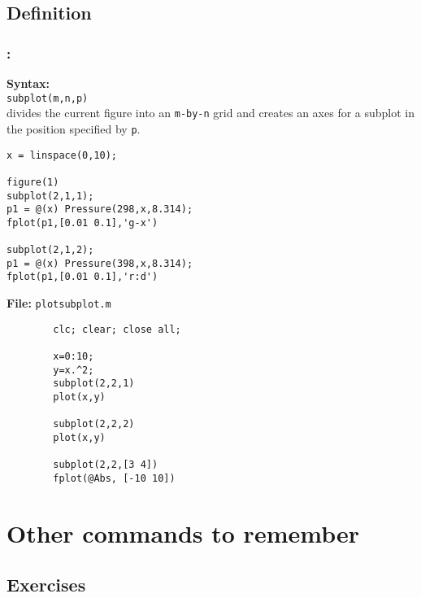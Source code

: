 \documentclass[11pt]{beamer}
\begin{document}
\subsection{Definition}
\begin{frame}[fragile]
	
	\frametitle{\secname : \subsecname}
	\vspace{-17pt}
	\begin{minipage}[t]{0.55\linewidth}
	\begin{exampleblock}{}
	\textbf{Syntax:}\\
	\verb|subplot(m,n,p)| \\
	divides the current figure into an \verb|m-by-n| grid and creates an axes for a subplot in the position specified by \verb|p|.
	\end{exampleblock}
	\vspace{-10pt}
	\begin{verbatim}
x = linspace(0,10);

figure(1)
subplot(2,1,1);
p1 = @(x) Pressure(298,x,8.314);
fplot(p1,[0.01 0.1],'g-x')
	
subplot(2,1,2);
p1 = @(x) Pressure(398,x,8.314);
fplot(p1,[0.01 0.1],'r:d')
	\end{verbatim}			
	\end{minipage}
	\hspace{7pt}
	\begin{minipage}[t]{0.41\linewidth}
	\vspace{10pt}
		\textbf{File:} \verb|plotsubplot.m|
		\begin{verbatim}
		clc; clear; close all;
		
		x=0:10;
		y=x.^2;
		subplot(2,2,1)
		plot(x,y)
		
		subplot(2,2,2)
		plot(x,y)
		
		subplot(2,2,[3 4])
		fplot(@Abs, [-10 10])
		\end{verbatim}	
	\end{minipage}
	
\end{frame}

\section{Other commands to remember}
\subsection{Exercises}
\end{document}
